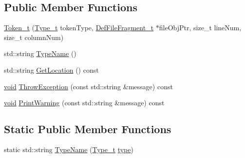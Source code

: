 \subsection*{Public Member Functions}
\begin{DoxyCompactItemize}
\item 
\hyperlink{structparse_tree_1_1_token__t_a604ff7f0b313580368a5674abfedf15b}{Token\+\_\+t} (\hyperlink{structparse_tree_1_1_token__t_ac0e6319a9ad80509dd4aa1037ba66096}{Type\+\_\+t} token\+Type, \hyperlink{structparse_tree_1_1_def_file_fragment__t}{Def\+File\+Fragment\+\_\+t} $\ast$file\+Obj\+Ptr, size\+\_\+t line\+Num, size\+\_\+t column\+Num)
\item 
std\+::string \hyperlink{structparse_tree_1_1_token__t_a7f6c6954b500383f32ca1aabef351c1c}{Type\+Name} ()
\item 
std\+::string \hyperlink{structparse_tree_1_1_token__t_a998f6d8add5baadaeab53ba21c0d296f}{Get\+Location} () const 
\item 
\hyperlink{_t_e_m_p_l_a_t_e__cdef_8h_ac9c84fa68bbad002983e35ce3663c686}{void} \hyperlink{structparse_tree_1_1_token__t_acf807a7daff40fbe48148ad9cd045d18}{Throw\+Exception} (const std\+::string \&message) const 
\item 
\hyperlink{_t_e_m_p_l_a_t_e__cdef_8h_ac9c84fa68bbad002983e35ce3663c686}{void} \hyperlink{structparse_tree_1_1_token__t_aff24cc8b11d69fc40c6d1202b8ec6a01}{Print\+Warning} (const std\+::string \&message) const 
\end{DoxyCompactItemize}
\subsection*{Static Public Member Functions}
\begin{DoxyCompactItemize}
\item 
static std\+::string \hyperlink{structparse_tree_1_1_token__t_a3115a873dd7489ad6390d7f14db56be8}{Type\+Name} (\hyperlink{structparse_tree_1_1_token__t_ac0e6319a9ad80509dd4aa1037ba66096}{Type\+\_\+t} \hyperlink{structparse_tree_1_1_token__t_a97c48431de51258f22ffda5d53c0b76d}{type})
\end{DoxyCompactItemize}
